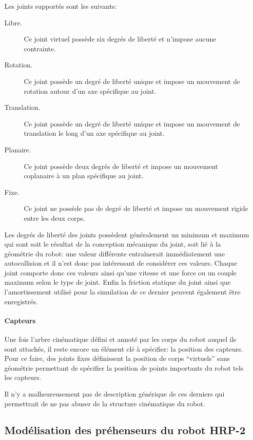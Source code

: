 Les joints supportés sont les suivants:
\begin{description}
\item[Libre.] Ce joint virtuel possède six degrés de liberté et
  n'impose aucune contrainte.
\item[Rotation.] Ce joint possède un degré de liberté unique et impose
  un mouvement de rotation autour d'un axe spécifique au joint.
\item[Translation.] Ce joint possède un degré de liberté unique et
  impose un mouvement de translation le long d'un axe spécifique au
  joint.
\item[Planaire.] Ce joint possède deux degrés de liberté et impose un
  mouvement coplanaire à un plan spécifique au joint.
\item[Fixe.] Ce joint ne possède pas de degré de liberté et impose un
  mouvement rigide entre les deux corps.
\end{description}

Les degrés de liberté des joints possèdent généralement un minimum et
maximum qui sont soit le résultat de la conception mécanique du joint,
soit lié à la géométrie du robot: une valeur différente entraînerait
immédiatement une autocollision et il n'est donc pas intéressant de
considérer ces valeurs. Chaque joint comporte donc ces valeurs ainsi
qu'une vitesse et une force ou un couple maximum selon le type de
joint. Enfin la friction statique du joint ainsi que l'amortissement
utilisé pour la simulation de ce dernier peuvent également être
enregistrés.


\paragraph{Capteurs}

Une fois l'arbre cinématique défini et annoté par les corps du robot
auquel ils sont attachés, il reste encore un élément clé à spécifier:
la position des capteurs. Pour ce faire, des joints fixes définissent
la position de corps ``virtuels'' sans géométrie permettant de
spécifier la position de points importants du robot tels les capteurs.

Il n'y a malheureusement pas de description générique de ces derniers
qui permettrait de ne pas abuser de la structure cinématique du robot.


\subsection{Modélisation des préhenseurs du robot HRP-2}

